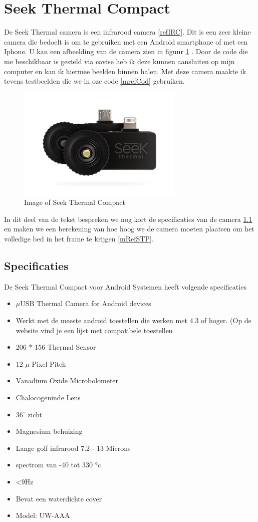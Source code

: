 \section{Seek Thermal Compact}
\label{mRefSTh}
De Seek Thermal camera is een infrarood camera \ref{refIRC}. Dit is een zeer kleine camera die bedoelt is om te gebruiken met een Android smartphone of met een Iphone. U kan een afbeelding van de camera zien in figuur \ref{imgSTC} \cite{bibImgSTC}. Door de code die me beschikbaar is gesteld via eavise \cite{bibSTC} heb ik deze kunnen aansluiten op mijn computer en kan ik hiermee beelden binnen halen. Met deze camera maakte ik tevens testbeelden die we in oze code \ref{mrefCod} gebruiken.
\begin{figure}[h]
	\includegraphics[scale=0.75]{SeekThermalCompac}
	\caption{Image of Seek Thermal Compact}
	\label{imgSTC}
\end{figure}
In dit deel van de tekst bespreken we nog kort de specificaties van de camera \ref{mRefSTS} en maken we een berekening van hoe hoog we de camera moeten plaatsen om het volledige bed in het frame te krijgen \ref{mRefSTP}.

\subsection{Specificaties}
\label{mRefSTS}
De Seek Thermal Compact voor Android Systemen heeft volgende specificaties
\begin{itemize}
	\item $\mu$USB Thermal Camera for Android devices
	\item Werkt met de meeste android toestellen die werken met 4.3 of hoger. (Op de website vind je een lijst met compatibele toestellen \cite{bibImgSTC}
	\item 206 * 156 Thermal Sensor
	\item 12 $\mu$ Pixel Pitch
	\item Vanadium Oxide Microbolometer
	\item Chalocogeninde Lens
	\item $36^{\circ}$ zicht
	\item Magnesium behuizing
	\item Lange golf infrarood 7.2 - 13 Microns
	\item  spectrom van -40 tot 330 °c
	\item <9Hz
	\item Bevat een waterdichte cover
	\item Model: UW-AAA
\end{itemize}
\cite{bibImgSTC}

